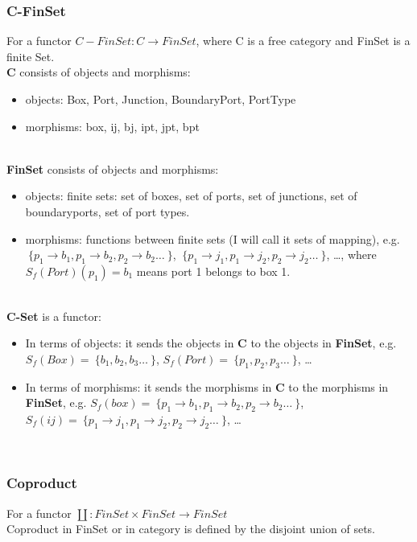\documentclass{article}
\begin{document}
\subsubsection{C-FinSet}
For a functor $C-FinSet: C \rightarrow FinSet$, where C is a free category and FinSet is a finite Set.
\\
\textbf{C} consists of objects and morphisms:
\begin{itemize}
    \item objects: Box, Port, Junction, BoundaryPort, PortType
    \item morphisms: box, ij, bj, ipt, jpt, bpt
\end{itemize}
\\
\textbf{FinSet} consists of objects and morphisms:
\begin{itemize}
    \item objects: finite sets: set of boxes, set of ports, set of junctions, set of boundaryports, set of port types.
    \item morphisms: functions between finite sets (I will call it sets of mapping), e.g. $~\{ p_1 \rightarrow b_1 , p_1 \rightarrow b_2 , p_2 \rightarrow b_2 \dots ~\}$, $~\{ p_1 \rightarrow j_1 , p_1 \rightarrow j_2 , p_2 \rightarrow j_2 \dots ~\}$, \dots, where $S_f(Port)(p_1)=b_1$ means port 1 belongs to box 1.
\end{itemize}
\\
\textbf{C-Set} is a functor:
\begin{itemize}
    \item In terms of objects: it sends the objects in \textbf{C} to the objects in \textbf{FinSet}, e.g. $S_f(Box) = ~\{ b_1 , b_2 , b_3 \dots ~\}$, $S_f(Port) = ~\{ p_1 , p_2 , p_3 \dots ~\}$, \dots
    \item In terms of morphisms: it sends the morphisms in \textbf{C} to the morphisms in \textbf{FinSet}, e.g. $S_f(box) = ~\{ p_1 \rightarrow b_1 , p_1 \rightarrow b_2 , p_2 \rightarrow b_2 \dots ~\}$, $S_f(ij) = ~\{ p_1 \rightarrow j_1 , p_1 \rightarrow j_2 , p_2 \rightarrow j_2 \dots ~\}$, \dots
\end{itemize}
\\
\subsubsection{Coproduct}
For a functor $\coprod: FinSet \times FinSet \rightarrow FinSet$\\
Coproduct in FinSet or in category is defined by the disjoint union of sets.\\
\end{document}
